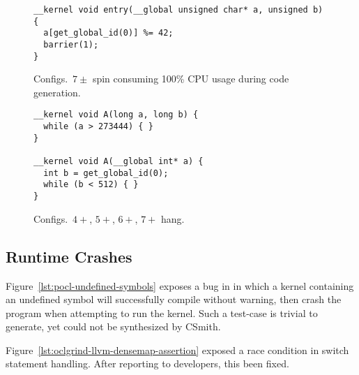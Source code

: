 \begin{figure}
\begin{lstlisting}
__kernel void entry(__global unsigned char* a, unsigned b) {
  a[get_global_id(0)] %= 42;
  barrier(1);
}
\end{lstlisting}
\caption{Configs.\ $7\pm$ spin consuming 100\% CPU usage during code generation.}
\end{figure}

%	

\begin{figure}
\begin{lstlisting}
__kernel void A(long a, long b) {
  while (a > 273444) { }
}

__kernel void A(__global int* a) {
  int b = get_global_id(0);
  while (b < 512) { }
}
\end{lstlisting}
\caption{Configs.\ $4+$, $5+$, $6+$, $7+$ hang.}
\end{figure}

\subsection{Runtime Crashes}

Figure~\ref{lst:pocl-undefined-symbols} exposes a bug in in which a kernel containing an undefined symbol will successfully compile without warning, then crash the program when attempting to run the kernel. Such a test-case is trivial to generate, yet could not be synthesized by CSmith.

Figure~\ref{lst:oclgrind-llvm-densemap-assertion} exposed a race condition in switch statement handling. After reporting to developers, this been fixed.

